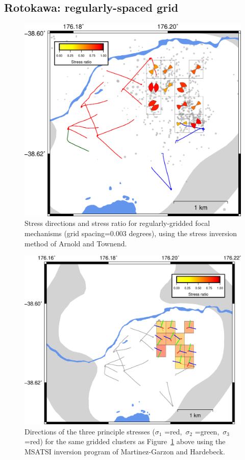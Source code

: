 \subsection{Rotokawa: regularly-spaced grid}

\begin{figure}[h!]
\begin{center}
\includegraphics[width=0.84\columnwidth]{Chapter_5_FMs/figures/2D_003_sigmas/merc_Rot_2D_grid003_Arnold_clust_SHmax_nu_original}
\caption{{Stress directions and stress ratio for regularly-gridded focal
mechanisms (grid spacing=0.003 degrees), using the stress inversion
method of Arnold and Townend.~
{\label{504037}}%
}}
\end{center}
\end{figure}

\begin{figure}[h!]
\begin{center}
\includegraphics[width=0.84\columnwidth]{Chapter_5_FMs/figures/merc_Rot_msatsi_003_2D/merc_Rot_msatsi_003_2D_original}
\caption{{Directions of the three principle stresses (\(\sigma_1\)
=red,~\(\sigma_2\) =green,~\(\sigma_3\) =red) for the same
gridded clusters as Figure~{\ref{504037}} above using
the MSATSI inversion program of Martinez-Garzon and Hardebeck.
{\label{317691}}%
}}
\end{center}
\end{figure}
